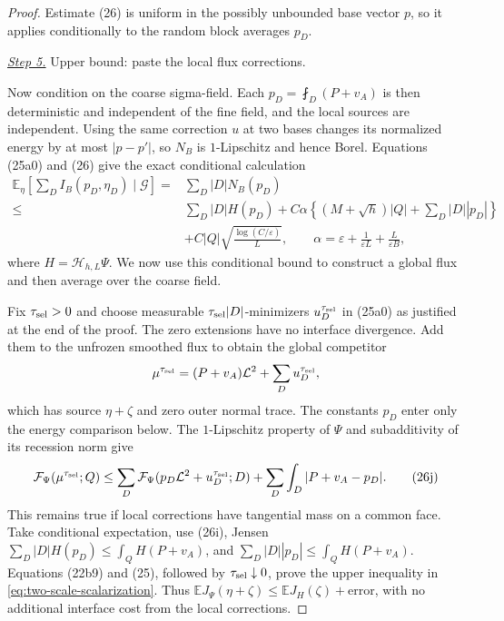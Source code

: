 \documentclass{aomart}
\theoremstyle{definition}
\newcommand{\1}{\mathbf 1}
\begin{document}
\begin{proof}
Estimate (26) is uniform in the possibly unbounded base vector $p$,
so it applies conditionally to the random block averages $p_D$.

\smallskip\noindent
\underline{\textit{Step 5.}} Upper bound: paste the local flux corrections.

Now condition on the coarse sigma-field.  Each
$p_ D=\fint_ D(P+v_ A)$ is then deterministic and independent of the
fine field, and the local sources are independent.  Using the same
correction $u$ at two bases changes its normalized energy by at most
$|p-p'|$, so $N_ B$ is $1$-Lipschitz and hence Borel.  Equations
(25a0) and (26) give the exact
conditional calculation
\begin{equation}
\begin{split}
\mathbb E_ \eta\!\left[\sum_ DI_ B(p_ D,\eta_ D)\mid\mathscr G\right]
={}&\sum_ D|D|N_ B(p_ D)\\
\leq{}&\sum_ D|D|H(p_ D)
+C\alpha\left\{(M+\sqrt h)|Q|+\sum_ D|D||p_ D|\right\}\\
&+C|Q|\sqrt{\frac{\log(C/\varepsilon)}L},\qquad
\alpha=\varepsilon+\frac1{\varepsilon L}
+\frac L{\varepsilon B},               
\end{split}
\tag{26i}
\end{equation}
where $H=\mathcal H_ {h,L}\Psi$.  We now use this conditional bound to construct a global flux and then
average over the coarse field.

Fix $\tau_{\rm sel}>0$ and choose measurable
$\tau_{\rm sel}|D|$-minimizers $u_ D^{\tau_{\rm sel}}$ in (25a0)
as justified at the end of the proof.  The zero extensions have no interface divergence.  Add them to the
unfrozen smoothed flux to obtain the global competitor
\begin{equation*}
\mu^{\tau_{\rm sel}}=(P+v_ A)\mathcal L^2+\sum_ Du_ D^{\tau_{\rm sel}},
\end{equation*}
which has source $\eta+\zeta$ and zero outer normal trace.  The constants
$p_D$ enter only the energy comparison below.  The $1$-Lipschitz property of $\Psi$ and
subadditivity of its recession norm give
\begin{equation}
\mathcal F_ \Psi(\mu^{\tau_{\rm sel}};Q)
\leq\sum_ D\mathcal F_ \Psi(p_ D\mathcal L^2+u_ D^{\tau_{\rm sel}};D)
+\sum_ D\int_ D|P+v_ A-p_ D|.
\tag{26j}
\end{equation}
This remains true if local corrections have tangential mass on a common
face.  Take conditional expectation, use (26i), Jensen
$\sum_ D|D|H(p_ D)\leq\int_ QH(P+v_ A)$, and
$\sum_ D|D||p_ D|\leq\int_ QH(P+v_ A)$.  Equations (22b9) and (25),
followed by $\tau_{\rm sel}\downarrow0$, prove the upper inequality in
\eqref{eq:two-scale-scalarization}.
Thus
$\mathbb EJ_ \Psi(\eta+\zeta)\leq\mathbb EJ_ H(\zeta)+\text{error}$,
with no additional interface cost from the local corrections.


\end{proof}
\end{document}
